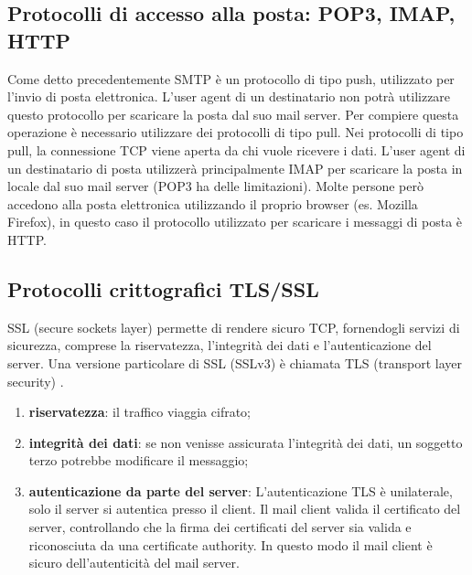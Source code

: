 \subsection{Protocolli di accesso alla posta: POP3, IMAP, HTTP}
Come detto precedentemente SMTP è un protocollo di tipo push, 
utilizzato per l’invio di posta elettronica. L’user agent di un destinatario non potrà utilizzare questo 
protocollo per scaricare la posta dal suo mail server. 
Per compiere questa operazione è necessario utilizzare dei protocolli di tipo pull. 
Nei protocolli di tipo pull, la connessione TCP viene aperta da chi vuole ricevere i dati. 
L’user agent di un destinatario di posta utilizzerà principalmente IMAP per scaricare la posta in locale 
dal suo mail server (POP3 ha delle limitazioni). 
Molte persone però accedono alla posta elettronica utilizzando il proprio browser (es. Mozilla Firefox), 
in questo caso il protocollo utilizzato per scaricare i messaggi di posta è HTTP.

\subsection{Protocolli crittografici TLS/SSL}
SSL (secure sockets layer) permette di rendere sicuro TCP,  fornendogli servizi di sicurezza, 
comprese la riservatezza, l’integrità dei dati e l’autenticazione del server. 
Una versione particolare di SSL (SSLv3) è chiamata TLS (transport layer security) \cite{tls}.

\begin{enumerate}
    \item \textbf{riservatezza}: il traffico viaggia cifrato;
    \item \textbf{integrità dei dati}: se non venisse assicurata l'integrità dei dati, un soggetto terzo
    potrebbe modificare il messaggio;
    \item \textbf{autenticazione da parte del server}: L'autenticazione TLS è unilaterale, solo il server si 
    autentica presso il client. Il mail client valida il certificato del server, controllando che la firma dei 
    certificati del server sia valida e riconosciuta da una certificate authority.
    In questo modo il mail client è sicuro dell'autenticità del mail server. 
\end{enumerate}


